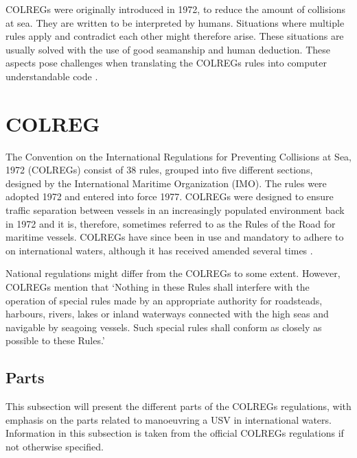 COLREGs were originally introduced in 1972, to reduce the amount of collisions at sea. They are written to be interpreted by humans. Situations where multiple rules apply and contradict each other might therefore arise. These situations are usually solved with the use of good seamanship and human deduction. These aspects pose challenges when translating the COLREGs rules into computer understandable code \cite{benjamin2006method}.


\chapter{COLREG}
\label{sec_colreg}
The Convention on the International Regulations for Preventing Collisions at Sea, 1972 (COLREGs) consist of 38 rules, grouped into five different sections, designed by the International Maritime Organization (IMO).
The rules were adopted 1972 and entered into force 1977.
COLREGs were designed to ensure traffic separation between vessels in an increasingly populated environment back in 1972 and it is, therefore, sometimes referred to as the Rules of the Road for maritime vessels.
COLREGs have since been in use and mandatory to adhere to on international waters, although it has received amended several times \cite{colreg_about_imo}.

National regulations might differ from the COLREGs to some extent. However, COLREGs mention that ‘Nothing in these Rules shall interfere with the operation of special rules made by an appropriate authority for roadsteads, harbours, rivers, lakes or inland waterways connected with the high seas and navigable by seagoing vessels.
Such special rules shall conform as closely as possible to these Rules.’ \cite{colreg}

\section{Parts}
This subsection will present the different parts of the COLREGs regulations, with emphasis on the parts related to manoeuvring a USV in international waters. Information in this subsection is taken from the official COLREGs regulations  \cite{colreg} if not otherwise specified.
